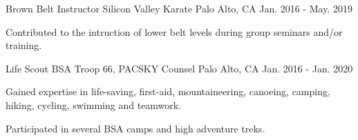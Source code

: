 

\begin{cventries}

  \cventry
    {Brown Belt Instructor} %
    {Silicon Valley Karate} %
    {Palo Alto, CA} %
    {Jan. 2016 - May. 2019} %
    {
      \begin{cvitems} %
        \item {Contributed to the intruction of lower belt levels during group
		seminars and/or training.}
      \end{cvitems}
    }

  \cventry
    {Life Scout} %
    {BSA Troop 66, PACSKY Counsel} %
    {Palo Alto, CA} %
    {Jan. 2016 - Jan. 2020} %
    {
      \begin{cvitems} %
        \item {Gained expertise in life-saving, first-aid, mountaineering,
		canoeing, camping, hiking, cycling, swimming and teamwork.}
        \item {Participated in several BSA camps and high adventure treks.}
      \end{cvitems}
    }

\end{cventries}
